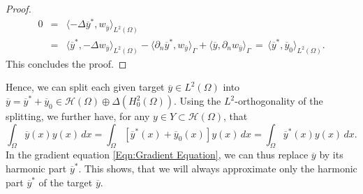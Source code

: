\documentclass{article}
\numberwithin{equation}{section}
\begin{document}
\begin{proof}
  \begin{eqnarray*}
    0
    & = & \langle -\Delta \overline{y}^\ast,w_{\overline{y}}
          \rangle_{L^2(\Omega)} \\
    & = & \langle \overline{y}^\ast,-\Delta w_{\overline{y}}
          \rangle_{L^2(\Omega)} -
          \langle \partial_n\overline{y}^\ast, w_{\overline{y}}
          \rangle_\Gamma  +
          \langle \overline{y},\partial_n w_{\overline{y}}
          \rangle_\Gamma \, = \,
          \langle \overline{y}^\ast,\overline{y}_0 \rangle_{L^2(\Omega)}. 
  \end{eqnarray*}
  This concludes the proof.
\end{proof}

\noindent
Hence, we can split each given target $\overline{y} \in L^2(\Omega)$ into
$\overline{y} = \overline{y}^\ast + \overline{y}_0 \in
\mathcal{H}(\Omega)\oplus \Delta(H^2_0(\Omega))$. Using the $L^2$-orthogonality
of the splitting, we further have, for any
$y\in Y\subset \mathcal{H}(\Omega)$, that  
\begin{equation*}
  \int_\Omega \overline{y}(x) y(x) \, dx =
  \int_\Omega [\overline{y}^\ast(x) + \overline{y}_0(x)] y(x) \, dx =
  \int_\Omega \overline{y}^\ast(x)y(x)\, dx.   
\end{equation*}
In the gradient equation \eqref{Eqn:Gradient Equation}, we can thus replace
$\overline{y}$ by its harmonic part $\overline{y}^\ast$. This shows, that we
will always approximate only the harmonic part $\overline{y}^\ast$ of the
target $\overline{y}$.  
\end{document}
